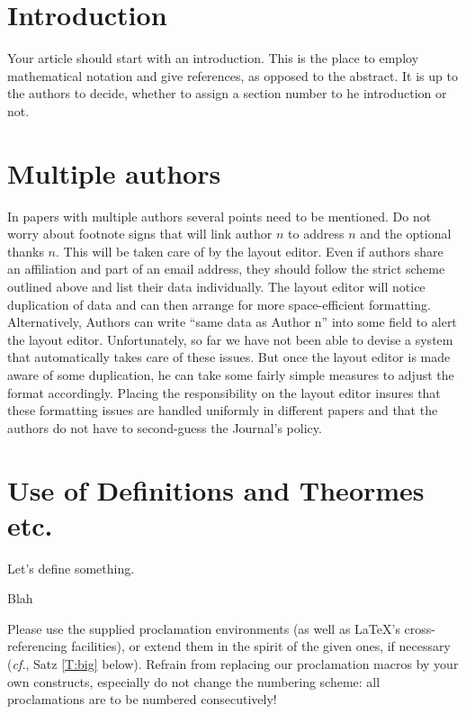\documentclass{lmcs}
\theoremstyle{plain}\newtheorem{satz}[thm]{Satz}
\def\cf{{\em cf.}}
\begin{document}
\section*{Introduction}\label{S:one}

  Your article should start with an introduction.  This is the place
  to employ mathematical notation and give references, as opposed to
  the abstract.  It is up to the authors to decide, whether to assign
  a section number to he introduction or not.

\section{Multiple authors}

  In papers with multiple authors several points need to be mentioned.
  Do not worry about footnote signs that will link author $n$ to
  address $n$ and the optional thanks $n$.  This will be taken care of
  by the layout editor.  Even if authors share an affiliation and part
  of an email address, they should follow the strict scheme outlined
  above and list their data individually.  The layout editor will
  notice duplication of data and can then arrange for more
  space-efficient formatting.  Alternatively, Authors can write ``same
  data as Author n'' into some field to alert the layout editor.
  Unfortunately, so far we have not been able to devise a system that
  automatically takes care of these issues.  But once the layout
  editor is made aware of some duplication, he can take some fairly
  simple measures to adjust the format accordingly.  Placing the
  responsibility on the layout editor insures that these formatting
  issues are handled uniformly in different papers and that the
  authors do not have to second-guess the Journal's policy.

\section{Use of  Definitions and Theormes etc.}

  Let's define something.

\begin{defi}\label{D:first}
  Blah
\end{defi}

  Please use the supplied proclamation environments (as well as
  LaTeX's cross-referencing facilities), or extend them in the spirit
  of the given ones, if necessary (\cf, Satz \ref{T:big} below).
  Refrain from replacing our proclamation macros by your own
  constructs, especially do not change the numbering scheme: all
  proclamations are to be numbered consecutively!
\end{document}
